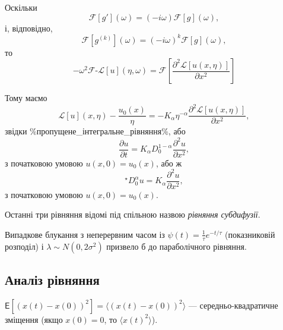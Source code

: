 Оскільки
\begin{equation}
    \mathcal{F}[g'](\omega) = (-i \omega) \mathcal{F}[g](\omega),
\end{equation}
і, відповідно,
\begin{equation}
    \mathcal{F}[g^{(k)}](\omega) = (-i \omega)^k \mathcal{F}[g](\omega),
\end{equation}
то
\begin{equation}
    - \omega^2 \mathcal{F}\text{-}\mathscr{L}[u](\eta,\omega) = \mathcal{F}\left[ \frac{\partial^2 \mathscr{L}[u(x,\eta)]}{\partial x^2} \right]
\end{equation}

Тому маємо
\begin{equation}
    \mathscr{L}[u](x,\eta) - \frac{u_0(x)}{\eta} = - K_\alpha \eta^{-\alpha} \frac{\partial^2 \mathscr{L}[u(x,\eta)]}{\partial x^2},
\end{equation}
звідки \%пропущене\_інтегральне\_рівняння\%, або
\begin{equation}
    \frac{\partial u}{\partial t} = K_\alpha D_0^{1 - \alpha} \frac{\partial^2 u}{\partial x^2},
\end{equation}
з початковою умовою $u(x, 0) = u_0(x)$, або ж
\begin{equation}
    {}^\star D_0^\alpha u = K_\alpha \frac{\partial^2 u}{\partial x^2},
\end{equation}
з початковою умовою $u(x, 0) = u_0(x)$.

\begin{definition}
    Останні три рівняння відомі під спільною назвою \textit{рівняння субдифузії}.
\end{definition}

\begin{remark}
    Випадкове блукання з неперервним часом із $\psi(t) = \frac{1}{\tau} e^{-t/\tau}$ (показниковій розподіл) і $\lambda \sim N(0, 2 \sigma^2)$ призвело б до параболічного рівняння.
\end{remark}

\subsection{Аналіз рівняння}

\begin{definition}
    $\mathsf{E}[(x(t) - x(0))^2] = \langle (x(t) - x(0))^2 \rangle$ --- середньо-квадратичне зміщення (якщо $x(0) = 0$, то $\langle x(t)^2 \rangle$).
\end{definition}

